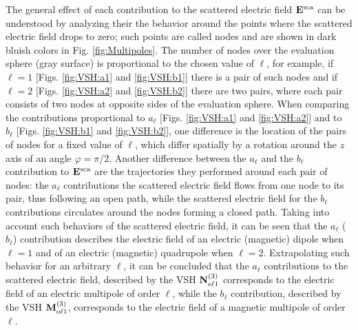 The general effect of each contribution to the scattered electric field  $\vb{E}^\text{sca}$  can be understood by analyzing their the behavior around the points where the scattered electric field drops to  zero; such points are called nodes and are shown in dark bluish colors in  Fig. \ref{fig:Multipoles}. The number of nodes over the evaluation sphere (gray surface) is proportional to the chosen value of $\ell$, for example, if $\ell = 1$ [Figs. \ref{fig:VSH:a1} and \ref{fig:VSH:b1}] there is a pair of such nodes and if $\ell = 2$ [Figs. \ref{fig:VSH:a2} and \ref{fig:VSH:b2}] there are two pairs, where each pair consists of two nodes at opposite sides of the evaluation sphere. When comparing the contributions proportional to $a_\ell$ [Figs. \ref{fig:VSH:a1} and \ref{fig:VSH:a2}] and  to $b_\ell$ [Figs. \ref{fig:VSH:b1} and \ref{fig:VSH:b2}], one difference is the location of the pairs of nodes for a fixed value of $\ell$, which differ spatially by a rotation around the $z$ axis of an angle $\varphi = \pi/2$.  Another difference between the $a_\ell$ and the $b_\ell$ contribution to  $\vb{E}^\text{sca}$ are the trajectories they performed around each pair of nodes: the $a_\ell$ contributions the scattered electric field flows from one node to its pair, thus following an open path, while the scattered electric field for the $b_\ell$ contributions circulates around the nodes forming a closed path. Taking into account such behaviors of the scattered electric field, it can be seen that the $a_\ell$ ($b_\ell$) contribution describes the electric field of an electric (magnetic) dipole when $\ell = 1$ and of an electric (magnetic) quadrupole when $\ell = 2$. Extrapolating such behavior for an arbitrary $\ell$,  it can be concluded that the $a_\ell$ contributions to the scattered electric field, described by the VSH $\vb{N}^{(3)}_{\text{e}\ell 1}$ corresponds to the electric field of an electric multipole of order $\ell$, while the $b_\ell$ contribution, described by the VSH $\vb{M}^{(3)}_{\text{o}\ell 1}$, corresponds to the electric field of a magnetic multipole of order $\ell$.

